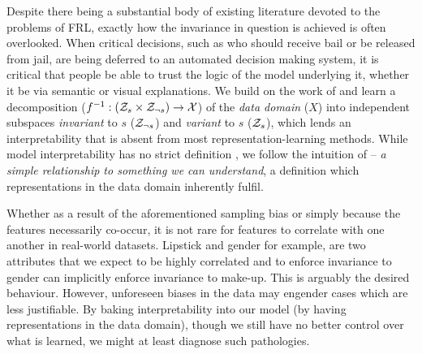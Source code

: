 Despite there being a substantial body of existing literature devoted to the problems of \acf{FRL},
exactly how the invariance in question is achieved is often overlooked.
%
When critical decisions, such as who should receive bail or be released from jail, are being
deferred to an automated decision making system, it is critical that people be able to trust the
logic of the model underlying it, whether it be via semantic or visual explanations. 
%
We build on the work of \citet{QuaShaTho19} and learn a decomposition ($f^{-1}: ({\mathcal{Z}}_s \times
{\mathcal{Z}}_{\neg s}) \to {\mathcal{X}}$) of the \emph{data domain} ($X$) into independent subspaces \emph{invariant}
to  $s$ (${\mathcal{Z}}_{\neg s}$) and \emph{variant} to $s$ (${\mathcal{Z}}_{s}$), which lends an interpretability
that is absent from most representation-learning methods. 
%
While model interpretability has no strict definition \citep{zhang2018visual}, we follow the
intuition of \citet{adel2018discovering} -- \emph{a simple relationship to something we can
understand}, a definition which representations in the data domain inherently fulfil.

Whether as a result of the aforementioned sampling bias or simply because the features necessarily
co-occur, it is not rare for features to correlate with one another in real-world datasets.
%
Lipstick and gender for example, are two attributes that we expect to be highly correlated and to
enforce invariance to gender can implicitly enforce invariance to make-up. 
%
This is arguably the desired behaviour. 
%
However, unforeseen biases in the data may engender cases which are less justifiable. 
%
By baking interpretability into our model (by having representations in the data domain), though we
still have no better control over what is learned, we might at least diagnose such pathologies.

